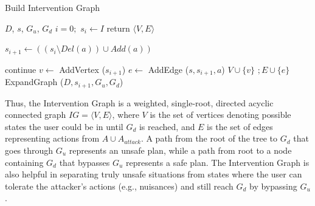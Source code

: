 \documentclass[letterpaper]{article}
\theoremstyle{plain}
\begin{document}
\begin{algorithm}[tb]
\tiny
        \caption{Build Intervention Graph}
        \label{bsg}
        \begin{algorithmic}[1]
                \Require $D$, $s$, $G_u$, $G_d$
                \State $i=0;$ $ s_{i} \gets I $
                 return $\langle V,E\rangle$
                \Else
                                \State \parbox[t]{0.95\linewidth} 
                                {$s_{i+1} \gets ((s_{i} \setminus Del(a))\cup Add(a))$}
                                 continue \EndIf
                                \State $v \gets$ AddVertex ($s_{i+1}$)
                                \State $e \gets$ AddEdge ($s, s_{i+1}, a$)
                                \State $V \cup \{v\}$ $; E \cup \{e\}$
                                \State ExpandGraph ($D, s_{i+1}, G_u, G_d$)
                        \EndFor
                \EndIf  
                \EndProcedure
        \end{algorithmic}
\end{algorithm}

Thus, the Intervention Graph is a weighted, single-root, directed acyclic connected graph $IG= \langle V,E \rangle$, where $V$ is the set of vertices denoting possible states the user could be in until $G_d$ is reached, and $E$ is the set of edges representing actions from $A \cup A_{attack}$. A path from the root of the tree to $G_d$ that goes through $G_u$ represents an unsafe plan, while a path from root to a node containing $G_d$ that bypasses $G_u$ represents a safe plan. The Intervention Graph is also helpful in separating truly unsafe situations from states where the user can tolerate the attacker's actions (e.g., nuisances) and still reach $G_d$ by bypassing $G_u$. 
\end{document}
